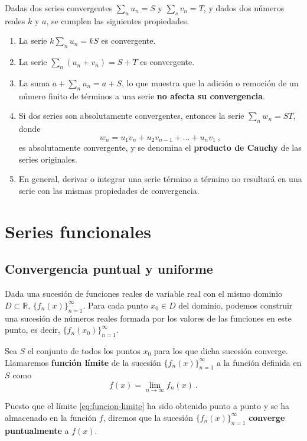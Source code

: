 Dadas dos series convergentes $\sum\limits_n u_n = S$ y $\sum\limits_s v_n = T$, y dados dos números reales $k$ y $a$, se cumplen las siguientes propiedades.
\begin{enumerate}
    \item La serie $k \sum\limits_n u_n = kS$ es convergente.
    \item La serie $\sum\limits_n (u_n + v_n) = S+T$ es convergente.
    \item La suma $a + \sum\limits_n u_n = a+S$, lo que muestra que la adición o remoción de un número finito de términos a una serie \textbf{no afecta su convergencia}.
    \item Si dos series son absolutamente convergentes, entonces la serie $\sum\limits_n w_n = ST$, donde
    \begin{equation*}
        w_n = u_1 v_n + u_2 v_{n-1} + \dots + u_nv_1 \ ,
    \end{equation*}
    es absolutamente convergente, y se denomina el \textbf{producto de Cauchy} de las series originales.
    \item En general, derivar o integrar una serie término a término no resultará en una serie con las mismas propiedades de convergencia.
\end{enumerate}

\section{Series funcionales}

\subsection{Convergencia puntual y uniforme}

Dada una sucesión de funciones reales de variable real con el mismo dominio $D \subset \mathbb{R}$, $\{ f_n(x) \}_{n=1}^\infty$. Para cada punto $x_0 \in D$ del dominio, podemos construir una sucesión de números reales formada por los valores de las funciones en este punto, es decir, $\{ f_n(x_0) \}_{n=1}^\infty$.

Sea $S$ el conjunto de todos los puntos $x_0$ para los que dicha sucesión converge. Llamaremos \textbf{función límite} de la sucesión $\{ f_n(x) \}_{n=1}^\infty$ a la función definida en $S$ como 
\begin{equation} \label{eq:funcion-limite}
    f(x) = \lim_{n \to \infty} f_n(x) \ .
\end{equation}

\begin{defi}
    Puesto que el límite \eqref{eq:funcion-limite} ha sido obtenido punto a punto y se ha almacenado en la función $f$, diremos que la sucesión $\{ f_n(x) \}_{n=1}^\infty$ \textbf{converge puntualmente} a $f(x)$.
\end{defi}

